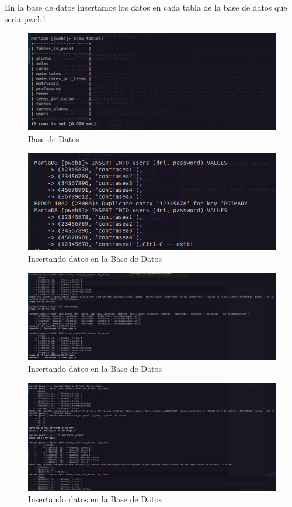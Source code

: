 En la base de datos insertamos los datos en cada tabla de la base de datos que seria pweb1
\begin{figure}[H]
  \centering
  \includegraphics[width=1.0\textwidth]{img/Tablas_pweb1.png}
  \caption{Base de Datos}
\end{figure}
\begin{figure}[H]
  \centering
  \includegraphics[width=1.0\textwidth]{img/Insertamosdatos_MariaDB.png}
  \caption{Insertando datos en la Base de Datos}
\end{figure}
\begin{figure}[H]
  \centering
  \includegraphics[width=1.0\textwidth]{img/Insertando_Datos_1.png}
  \caption{Insertando datos en la Base de Datos}
\end{figure}
\begin{figure}[H]
  \centering
  \includegraphics[width=1.0\textwidth]{img/Insertando_Datos_2.png}
  \caption{Insertando datos en la Base de Datos}
\end{figure}
